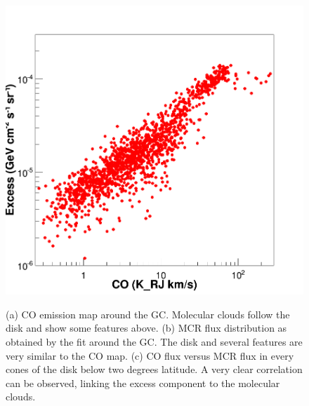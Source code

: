 \begin{figure}[h]
\begin{minipage}[h]{0.45\textwidth}
	  \subcaption{}
  	  \label{fig:MCR_GC}
  \end{minipage}
  \hfill
  \begin{minipage}[h]{0.45\textwidth}
	  \centering
	  \includegraphics[width=\linewidth]{pic/results/correlation.png}
	  \subcaption{}
  	  \label{fig:correlation}
  \end{minipage}
  \caption[CO and MCR correlation plots.]{(a) CO emission map around the GC. Molecular clouds follow the disk and show some features above. (b) MCR flux distribution as obtained by the fit around the GC. The disk and several features are very similar to the CO map. (c) CO flux versus MCR flux in every cones of the disk below two degrees latitude. A very clear correlation can be observed, linking the excess component to the molecular clouds.}
  \label{fig:CO_MCR_correlation}
\end{figure}


